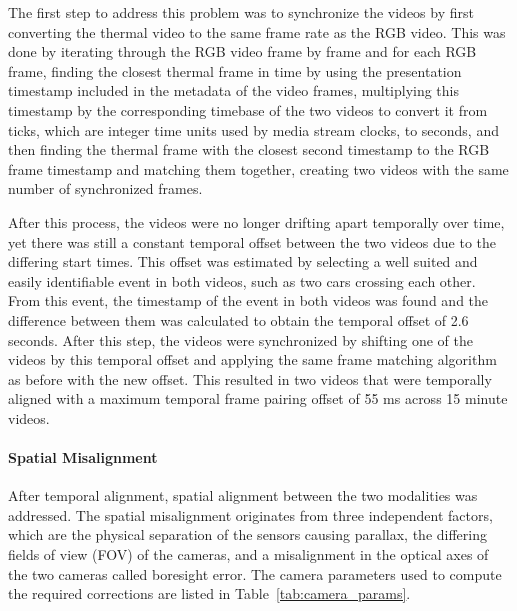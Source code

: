 \documentclass[12pt,oneside,bibtotoc,liststotoc]{scrbook}
\begin{document}
The first step to address this problem was to synchronize the videos by first
converting the thermal video to the same frame rate as the RGB video. This was done by
iterating through the RGB video frame by frame and for each RGB frame,
finding the closest thermal frame in time by using the presentation timestamp
included in the metadata of the video frames, multiplying this timestamp
by the corresponding timebase of the two videos to convert it from ticks, which are
integer time units used by media stream clocks, to seconds, and then finding the
thermal frame with the closest second timestamp to the RGB frame timestamp and matching
them together, creating two videos with the same number of synchronized frames.

After this process, the videos were no longer drifting apart temporally over time, yet
there was still a constant temporal offset between the two videos due to the differing
start times. This offset was estimated by selecting a well suited and easily identifiable
event in both videos, such as two cars crossing each other.
From this event, the timestamp
of the event in both videos was found and the difference between them was calculated
to obtain the temporal offset of 2.6 seconds. After this step, the videos were synchronized by shifting
one of the videos by this temporal offset and applying the same frame matching algorithm
as before with the new offset. This resulted in two videos that were temporally aligned
with a maximum temporal frame pairing offset of 55 ms across 15 minute videos.

\vspace{-0.6em}
\paragraph{Spatial Misalignment}
After temporal alignment, spatial alignment between the two modalities was
addressed. The spatial misalignment originates from three independent
factors, which are the physical separation of the sensors causing parallax,
the differing fields of view (FOV) of the cameras, and a misalignment in
the optical axes of the two cameras called boresight error.
The camera parameters used to compute the required corrections are
listed in Table~\ref{tab:camera_params}.
\end{document}
